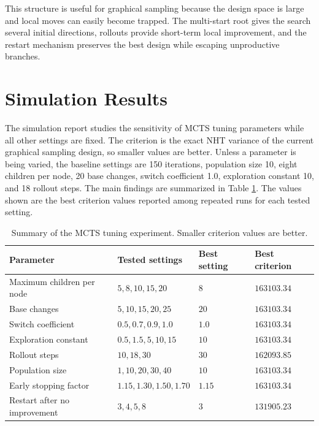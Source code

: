 \documentclass[twoside]{article}
\begin{document}
This structure is useful for graphical sampling because the design space is
large and local moves can easily become trapped. The multi-start root gives
the search several initial directions, rollouts provide short-term local
improvement, and the restart mechanism preserves the best design while
escaping unproductive branches.

\section{Simulation Results}

The simulation report studies the sensitivity of MCTS tuning parameters while
all other settings are fixed. The criterion is the exact NHT variance of the
current graphical sampling design, so smaller values are better. Unless a
parameter is being varied, the baseline settings are 150 iterations, population
size 10, eight children per node, 20 base changes, switch coefficient 1.0,
exploration constant 10, and 18 rollout steps.
The main findings are summarized in Table \ref{tab:tuning}. The values shown
are the best criterion values reported among repeated runs for each tested
setting.

\begin{table}[ht]
\begin{center}
\footnotesize
\caption{Summary of the MCTS tuning experiment. Smaller criterion values are
better.}\label{tab:tuning}
\begin{tabular}{|p{3.2cm}|p{4.7cm}|p{2.0cm}|p{2.4cm}|}
\hline
Parameter & Tested settings & Best setting & Best criterion \\ \hline \hline
Maximum children per node & $5,8,10,15,20$ & $8$ & $163103.34$ \\ \hline
Base changes & $5,10,15,20,25$ & $20$ & $163103.34$ \\ \hline
Switch coefficient & $0.5,0.7,0.9,1.0$ & $1.0$ & $163103.34$ \\ \hline
Exploration constant & $0.5,1.5,5,10,15$ & $10$ & $163103.34$ \\ \hline
Rollout steps & $10,18,30$ & $30$ & $162093.85$ \\ \hline
Population size & $1,10,20,30,40$ & $10$ & $163103.34$ \\ \hline
Early stopping factor & $1.15,1.30,1.50,1.70$ & $1.15$ & $163103.34$ \\ \hline
Restart after no improvement & $3,4,5,8$ & $3$ & $131905.23$ \\ \hline
\end{tabular}
\end{center}
\end{table}
\end{document}
